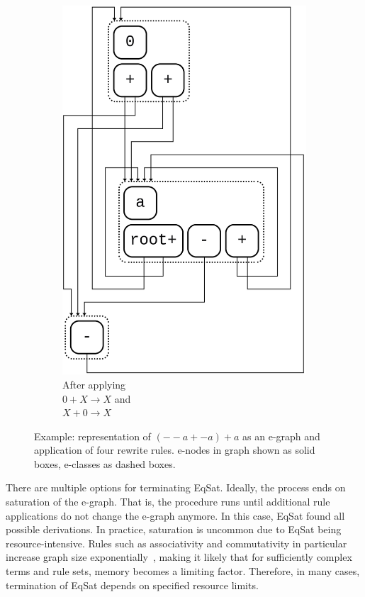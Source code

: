 \begin{figure}[h]
\begin{subfigure}[t]{0.23\textwidth}
		\includegraphics[width=1.4\linewidth,height=1.4\linewidth,keepaspectratio=true]{img/e_graph4.png}
		\caption{\scriptsize After applying\\$0 + X \to X$ and\\$X + 0 \to X$}
		\label{fig:e-graph-sub4}
	\end{subfigure}
	\caption{Example: representation of $(--a + -a) + a$ as an e-graph and application of four rewrite rules. e-nodes in graph shown as solid boxes, e-classes as dashed boxes.}
	\label{fig:e-graph-example}
\end{figure}

There are multiple options for terminating EqSat. Ideally, the process ends on saturation of the e-graph. That is, the procedure runs until additional rule applications do not change the e-graph anymore. In this case, EqSat found all possible derivations. In practice, saturation is uncommon due to EqSat being resource-intensive. Rules such as associativity and commutativity in particular increase graph size exponentially~\citep{zhang2023}, making it likely that for sufficiently complex terms and rule sets, memory becomes a limiting factor. Therefore, in many cases, termination of EqSat depends on specified resource limits.

